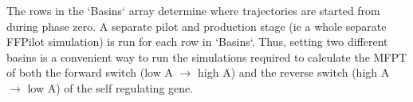 The rows in the `Basins` array determine where trajectories are started from during phase zero. A separate pilot and production stage (ie a whole separate FFPilot simulation) is run for each row in `Basins`. Thus, setting two different basins is a convenient way to run the simulations required to calculate the MFPT of both the forward switch (low A $\rightarrow$ high A) and the reverse switch (high A $\rightarrow$ low A) of the self regulating gene.

